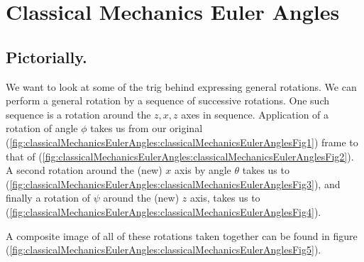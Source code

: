 %
%

\chapter{Classical Mechanics Euler Angles}
\label{chap:classicalMechanicsEulerAngles}
{}
\date{Mar 21, 2012}

\beginArtWithToc

\section{Pictorially.}

We want to look at some of the trig behind expressing general rotations.  We can perform a general rotation by a sequence of successive rotations.  One such sequence is a rotation around the $z,x,z$ axes in sequence.  Application of a rotation of angle $\phi$ takes us from our original (\ref{fig:classicalMechanicsEulerAngles:classicalMechanicsEulerAnglesFig1}) frame to that of (\ref{fig:classicalMechanicsEulerAngles:classicalMechanicsEulerAnglesFig2}).  A second rotation around the (new) $x$ axis by angle $\theta$ takes us to (\ref{fig:classicalMechanicsEulerAngles:classicalMechanicsEulerAnglesFig3}), and finally a rotation of $\psi$ around the (new) $z$ axis, takes us to (\ref{fig:classicalMechanicsEulerAngles:classicalMechanicsEulerAnglesFig4}).

A composite image of all of these rotations taken together can be found in figure (\ref{fig:classicalMechanicsEulerAngles:classicalMechanicsEulerAnglesFig5}).

